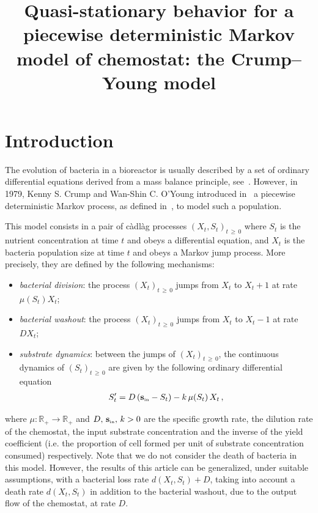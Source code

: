 \documentclass[AHL,Unicode,longabstracts,published]{cedram}
\title[Quasi-stationary behavior of the Crump--Young model]{Quasi-stationary behavior for a piecewise deterministic Markov model of chemostat: the Crump--Young model}
\author[\initial{B.} \lastname{Cloez}]{\firstname{Bertrand} \lastname{Cloez}}
\author[\initial{C.} \lastname{Fritsch}]{\firstname{Coralie} \lastname{Fritsch}}
\newcommand{\RR}{\mathbb{R}}
\newcommand{\Sin}{{\mathbf s}_{\textrm{\tiny\rm in}}}
\newcommand{\1}{\mathbf{1}}
\begin{document}
\maketitle



\section{Introduction}\label{sec:intro}



The evolution of bacteria in a bioreactor is usually described by a set of ordinary differential equations derived from a mass balance principle, see~\cite{HLRS,SW95}. However, in 1979, Kenny S. Crump and Wan-Shin C. O’Young introduced in~\cite{CY79} a piecewise deterministic Markov process, as defined in~\cite{D93}, to model such a population.

This model consists in a pair of càdlàg processes $(X_t,S_t)_{t\,\geq\,0}$ where $S_t$ is the nutrient concentration at time $t$ and obeys a differential equation, and $X_t$ is the bacteria population size at time $t$ and obeys a Markov jump process. More precisely, they are defined by the following mechanisms:
\begin{itemize}
\item \emph{bacterial division}: the process $(X_t)_{t\,\geq\,0}$ jumps from $X_t$ to $X_t +1$ at rate $ \mu(S_t) X_t$;
\item \emph{bacterial washout}: the process $(X_t)_{t\,\geq\,0}$ jumps from $X_t$ to $X_t -1$ at rate $ D X_t$;
\item \emph{substrate dynamics}: between the jumps of $(X_t)_{t\,\geq\,0}$, the continuous dynamics of $(S_t)_{t\,\geq\,0}$ are given by the following ordinary differential equation
\begin{align}\label{eq:substrate}
S'_t = D\,(\Sin-S_t)-k\,\mu(S_t)\, X_t \,,
\end{align}
\end{itemize}
where $\mu:\RR_+\to \RR_+$ and $D,\,\Sin,\,k>0$ are the specific growth rate, the dilution rate of the chemostat, the input substrate concentration and the inverse of the yield coefficient (i.e. the proportion of cell formed per unit of substrate concentration consumed) respectively. Note that we do not consider the death of bacteria in this model. However, the results of this article can be generalized, under suitable assumptions, with a bacterial loss rate $d(X_t, S_t)+D$, taking into account a death rate $d(X_t, S_t)$ in addition to the bacterial washout, due to the output flow of the chemostat, at rate $D$.
\end{document}

